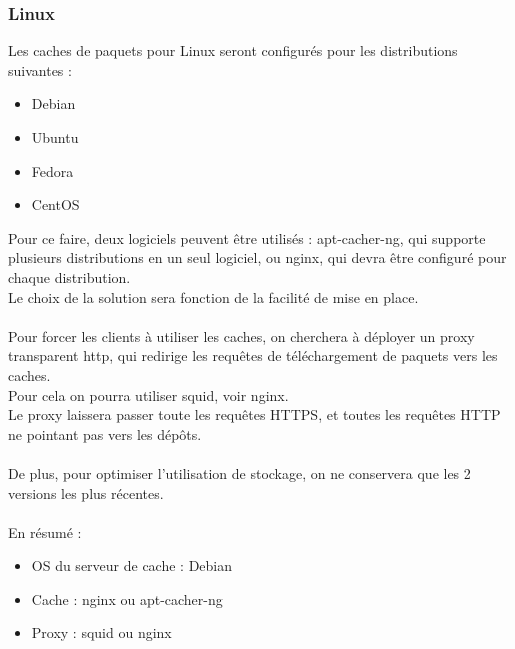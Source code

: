 \documentclass[14pt,a4paper]{extarticle}
\begin{document}
\subsubsection{Linux}
Les caches de paquets pour Linux seront configurés pour les distributions suivantes :
\begin{itemize}
    \item{Debian}
    \item{Ubuntu}
    \item{Fedora}
    \item{CentOS}
\end{itemize}
Pour ce faire, deux logiciels peuvent être utilisés : apt-cacher-ng, qui supporte plusieurs distributions en un seul logiciel, ou nginx, qui devra être configuré pour chaque distribution. \\
Le choix de la solution sera fonction de la facilité de mise en place.\\\\ 
Pour forcer les clients à utiliser les caches, on cherchera à déployer un proxy transparent http, qui redirige les requêtes de téléchargement de paquets vers les caches. \\ 
Pour cela on pourra utiliser squid, voir nginx.\\ 
Le proxy laissera passer toute les requêtes HTTPS, et toutes les requêtes HTTP ne pointant pas vers les dépôts.\\\\
De plus, pour optimiser l'utilisation de stockage, on ne conservera que les 2 versions les plus récentes. \\\\

\break
En résumé :
\begin{itemize}
    \item{OS du serveur de cache : Debian}
    \item{Cache : nginx ou apt-cacher-ng}
    \item{Proxy : squid ou nginx}
\end{itemize}
\end{document}
